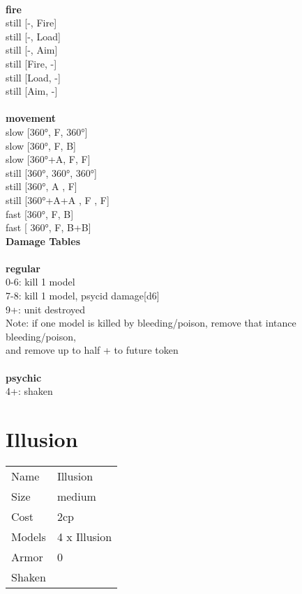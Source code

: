 \ \\ {\bf fire } \\
still [-, Fire] \\
still [-, Load] \\
still [-, Aim] \\
still [Fire, -] \\
still [Load, -] \\
still [Aim, -] \\
\ \\ {\bf movement } \\
slow [360°, F, 360°] \\
slow [360°, F, B] \\
slow [360°+A, F, F] \\
still [360°, 360°, 360°] \\
still [360°, A , F] \\
still [360°+A+A , F , F] \\
fast [360°, F, B] \\
fast [ 360°,  F, B+B] \\


{\bf Damage Tables} \\
\ \\ {\bf regular } \\
0-6: kill 1 model \\
7-8: kill 1 model, psycid damage[d6] \\
9+: unit destroyed \\
Note: if one model is killed by bleeding/poison, remove that intance bleeding/poison, \\ and remove up to half + to future token \\
\ \\ {\bf psychic } \\
4+: shaken \\










\pagebreak\pagebreak

\section{ Illusion }

\begin{tabular}{ll}
  Name & Illusion \\
  Size & medium\\
  Cost & 2cp\\
  Models & 4 x Illusion\\
  Armor & 0\\
  Shaken & \\
\end{tabular}

